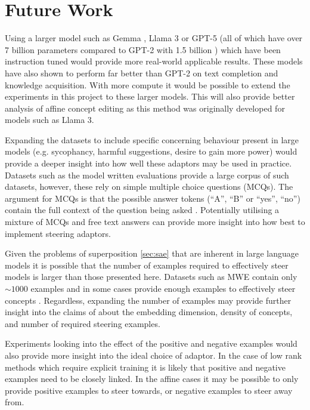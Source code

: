 \section{Future Work}

Using a larger model such as Gemma \citep{gemma}, Llama 3 \citep{llama3} or GPT-5 \citep{gpt-5} (all of which have over 7 billion parameters compared to GPT-2 with 1.5 billion \citep{gpt2-1.5}) which have been instruction tuned would provide more real-world applicable results.
These models have also shown to perform far better than GPT-2 on text completion and knowledge acquisition.
With more compute it would be possible to extend the experiments in this project to these larger models.
This will also provide better analysis of affine concept editing \citep[ACE]{ace} as this method was originally developed for models such as Llama 3.

Expanding the datasets to include specific concerning behaviour present in large models (e.g. sycophancy, harmful suggestions, desire to gain more power) would provide a deeper insight into how well these adaptors may be used in practice.
Datasets such as the model written evaluations \citep[MWE]{mwe} provide a large corpus of such datasets, however, these rely on simple multiple choice questions (MCQs).
The argument for MCQs is that the possible answer tokens (``A'', ``B'' or ``yes'', ``no'') contain the full context of the question being asked \citep{steering-taxonomy}.
Potentially utilising a mixture of MCQs and free text answers can provide more insight into how best to implement steering adaptors.

Given the problems of superposition \cref{sec:sae} that are inherent in large language models it is possible that the number of examples required to effectively steer models is larger than those presented here.
Datasets such as MWE contain only $\sim 1000$ examples and in some cases provide enough examples to effectively steer concepts \citep{steerability}.
Regardless, expanding the number of examples may provide further insight into the claims of \citet{steering-clear} about the embedding dimension, density of concepts, and number of required steering examples.

Experiments looking into the effect of the positive and negative examples would also provide more insight into the ideal choice of adaptor.
In the case of low rank methods which require explicit training it is likely that positive and negative examples need to be closely linked.
In the affine cases it may be possible to only provide positive examples to steer towards, or negative examples to steer away from.
